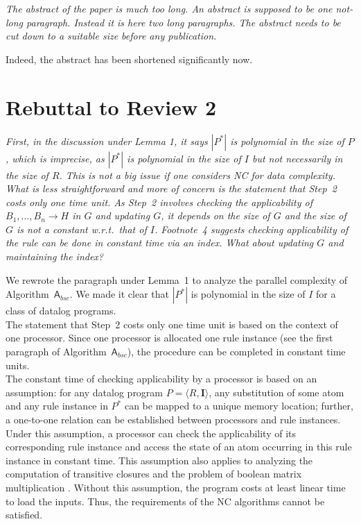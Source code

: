 \documentclass{article}
\let\quoteOld\quote
\let\endquoteOld\endquote
\renewenvironment{quote}{\quoteOld\itshape}{\endquoteOld}
\begin{document}
\begin{quote}
The abstract of the paper is much too long.  An abstract is supposed to be
one not-long paragraph.  Instead it is here two long paragraphs.  The
abstract needs to be cut down to a suitable size before any publication.
\end{quote}

Indeed, the abstract has been shortened significantly now.


\section{Rebuttal to Review 2}

\begin{quote}
First, in the discussion under Lemma 1, it says $|P^*|$ is polynomial in the size of $P$, which is imprecise, as $|P^*|$ is polynomial in the size of $I$ but not necessarily in the size of $R$. This is not a big issue if one considers NC for data complexity. What is less straightforward and more of concern is the statement that Step~2 costs only one time unit. As Step~2 involves checking the applicability of $B_1, \ldots, B_n \to H$ in $G$ and updating $G$, it depends on the size of $G$ and the size of $G$ is not a constant w.r.t.\ that of $I$. Footnote~4 suggests checking applicability of the rule can be done in constant time via an index. What about updating $G$ and maintaining the index?
\end{quote}

We rewrote the paragraph under Lemma~1 to analyze the parallel complexity of Algorithm~$\mathsf{A}_{bsc}$.
We made it clear that $|P^*|$ is polynomial in the size of $I$ for a class of datalog programs.\\

The statement that Step~2 costs only one time unit is based on the context of one processor. Since one processor
is allocated one rule instance (see the first paragraph of Algorithm~$\mathsf{A}_{bsc}$),
the procedure can be completed in constant time units. \\

The constant time of checking applicability by a processor is based on an assumption:
for any datalog program $P=\langle R, \textbf{I}\rangle$,
any substitution of some atom and any rule instance in $P^*$ can be mapped to a unique memory
location; further, a one-to-one relation can be established between processors and rule instances.
Under this assumption, a processor can check the applicability of its corresponding
rule instance and access the state of an atom occurring in this rule instance in constant time.
This assumption also applies to analyzing the computation of transitive closures \cite{Allender07} and
the problem of boolean matrix multiplication \cite{Raymond95}. Without this assumption, the program
costs at least linear time to load the inputs. Thus, the requirements of the NC algorithms
cannot be satisfied.\\
\end{document}
